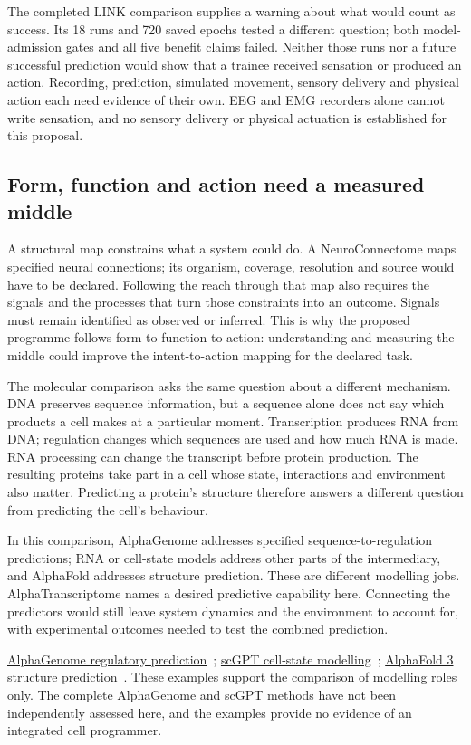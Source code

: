 The completed LINK comparison supplies a warning about what would count as
success. Its 18 runs and 720 saved epochs tested a different question; both
model-admission gates and all five benefit claims failed. Neither those runs
nor a future successful prediction would show that a trainee received sensation
or produced an action. Recording, prediction, simulated movement, sensory
delivery and physical action each need evidence of their own. EEG and EMG
recorders alone cannot write sensation, and no sensory delivery or physical
actuation is established for this proposal.

\subsection{Form, function and action need a measured middle}
A structural map constrains what a system could do. A NeuroConnectome maps
specified neural connections; its organism, coverage, resolution and source
would have to be declared. Following the reach through that map also requires
the signals and the processes that turn those constraints into an outcome.
Signals must remain identified as observed or inferred. This is why the proposed
programme follows form to function to action: understanding and measuring the
middle could improve the intent-to-action mapping for the declared task.

The molecular comparison asks the same question about a different mechanism.
DNA preserves sequence information, but a sequence alone does not say which products a cell makes at a particular moment. Transcription produces RNA from DNA; regulation changes which sequences are used and how much RNA is made. RNA processing can change the transcript before protein production. The resulting proteins take part in a cell whose state, interactions and environment also matter. Predicting a protein's structure therefore answers a different question from predicting the cell's behaviour.

In this comparison, AlphaGenome addresses specified sequence-to-regulation predictions; RNA or cell-state models address other parts of the intermediary, and AlphaFold addresses structure prediction. These are different modelling jobs. AlphaTranscriptome names a desired
predictive capability here. Connecting the predictors would still leave system
dynamics and the environment to account for, with experimental outcomes needed
to test the combined prediction.
\par\noindent \href{https://www.nature.com/articles/s41586-025-10014-0}{AlphaGenome regulatory prediction}~\cite{alphagenomeRetained};
\href{https://www.nature.com/articles/s41592-024-02201-0}{scGPT cell-state modelling}~\cite{scgptRetained};
\href{https://www.nature.com/articles/s41586-024-07487-w}{AlphaFold 3 structure prediction}~\cite{abramson2024}.
These examples support the comparison of modelling roles only. The complete
AlphaGenome and scGPT methods have not been independently assessed here, and
the examples provide no evidence of an integrated cell programmer.


